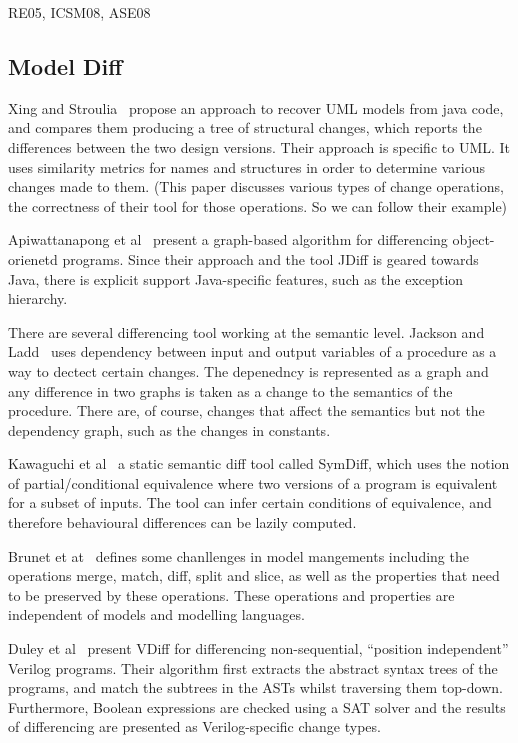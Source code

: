\documentclass[10pt, conference, compsocconf]{IEEEtran}
\begin{document}
   RE05, ICSM08, ASE08
   
\subsection{Model Diff}
Xing and Stroulia~\cite{xing05ase} propose an approach to recover UML models from java code, and compares them producing a tree of structural changes, which reports the differences between the
two design versions.  Their approach is specific to UML. It uses similarity metrics for names and structures in order to determine various changes made to them. (This paper discusses various types of change operations, the correctness of their tool for those operations. So we can follow their example)

Apiwattanapong et al~\cite{Apiwattanapong:2004:DAO:1025115.1025202} present a graph-based algorithm for differencing object-orienetd programs. Since their approach and the tool JDiff is geared towards Java, there is explicit support Java-specific features, such as the exception hierarchy.




There are several differencing tool working at the semantic level. Jackson and Ladd~\cite{Jackson:1994:SDT:645543.655704} uses dependency between input and output variables of a procedure as a way to dectect certain changes. The depenedncy is represented as a graph and any difference in two graphs is taken as a change to the semantics of the procedure. There are, of course, changes that affect the semantics but not the dependency graph, such as the changes in constants.

Kawaguchi et al~\cite{Kawaguchietal2010} a static semantic diff tool called SymDiff, which uses the notion of partial/conditional equivalence where two versions of a program is equivalent for a subset of inputs.  The tool can infer certain conditions of equivalence, and therefore behavioural differences can be lazily computed. 

Brunet et at~\cite{brunet06gamma} defines some chanllenges in model mangements including the operations merge, match, diff, split and slice, as well as the properties that need to be preserved by these operations. These operations and properties are independent of models and modelling languages.

Duley et al~\cite{Duley:2010:PDA:1858996.1859093} present VDiff for differencing non-sequential, ``position independent'' Verilog programs. Their algorithm first extracts the abstract syntax trees of the programs, and match the subtrees in the ASTs whilst traversing them top-down. Furthermore, Boolean expressions are checked using a SAT solver and the results of differencing are presented as Verilog-specific change types.
\end{document}
